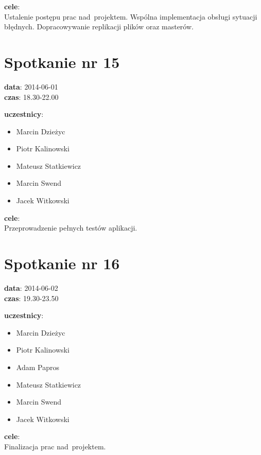\vspace{5mm}
\noindent
\textbf{cele}: \\
Ustalenie postępu prac nad~projektem. Wspólna implementacja obsługi sytuacji
błędnych. Dopracowywanie replikacji plików oraz masterów.

\section[Spotkanie nr 15][Spotkanie nr 15]{Spotkanie nr 15}

\noindent
\textbf{data}: 2014-06-01 \\
\textbf{czas}: 18.30-22.00

\vspace{5mm}
\noindent
\textbf{uczestnicy}:
\begin{itemize}
	\item Marcin Dzieżyc
	\item Piotr Kalinowski
	\item Mateusz Statkiewicz
	\item Marcin Swend
	\item Jacek Witkowski
\end{itemize}

\vspace{5mm}
\noindent
\textbf{cele}: \\
Przeprowadzenie pełnych testów aplikacji.

\section[Spotkanie nr 16][Spotkanie nr 16]{Spotkanie nr 16}

\noindent
\textbf{data}: 2014-06-02 \\
\textbf{czas}: 19.30-23.50

\vspace{5mm}
\noindent
\textbf{uczestnicy}:
\begin{itemize}
	\item Marcin Dzieżyc
	\item Piotr Kalinowski
	\item Adam Papros
	\item Mateusz Statkiewicz
	\item Marcin Swend
	\item Jacek Witkowski
\end{itemize}

\vspace{5mm}
\noindent
\textbf{cele}: \\
Finalizacja prac nad~projektem.
